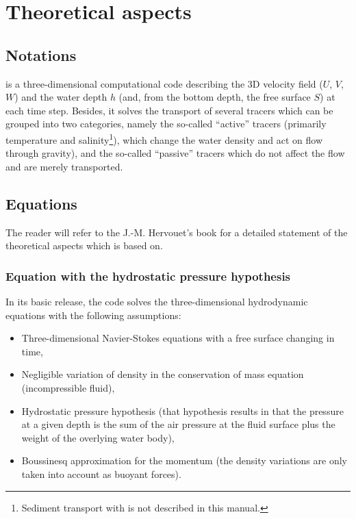 \chapter{Theoretical aspects}


\section{Notations}

 is a three-dimensional computational code describing the 3D
velocity field ($U$, $V$, $W$) and the water depth
$h$ (and, from the bottom depth, the free surface $S$) at each
time step. Besides, it solves the transport of several tracers which can be
grouped into two categories, namely the so-called ``active'' tracers (primarily
temperature and salinity\footnote{ Sediment transport with  is not
described in this manual.}), which change the water density and act on flow
through gravity), and the so-called ``passive'' tracers which do not affect the
flow and are merely transported.

\section{Equations}

The reader will refer to the J.-M. Hervouet's book \cite{Hervouet2007} for a
detailed statement of the theoretical aspects which  is based on.

\subsection{Equation with the hydrostatic pressure hypothesis}

In its basic release, the code solves the three-dimensional hydrodynamic
equations with the following assumptions:

\begin{itemize}
\item Three-dimensional Navier-Stokes equations with a free surface changing
in time,
\item Negligible variation of density in the conservation of mass equation
(incompressible fluid),
\item Hydrostatic pressure hypothesis (that hypothesis results in that the
pressure at a given depth is the sum of the air pressure at the fluid surface
plus the weight of the overlying water body),
\item Boussinesq approximation for the momentum (the density variations are
only taken into account as buoyant forces).
\end{itemize}

